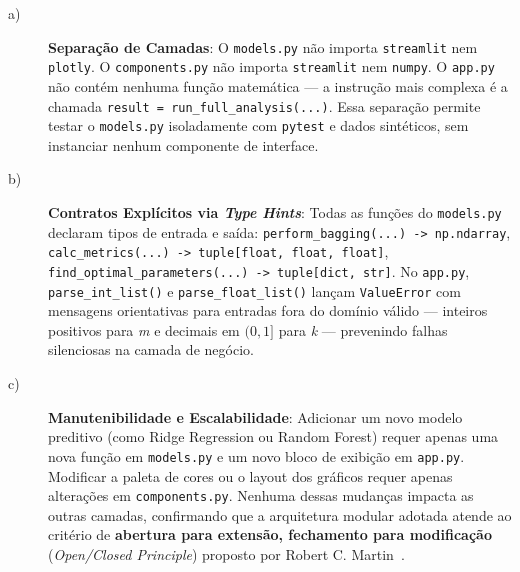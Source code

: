 \begin{description}

\item[a)] \textbf{Separação de Camadas}: O \texttt{models.py} não importa
\texttt{streamlit} nem \texttt{plotly}. O \texttt{components.py} não importa
\texttt{streamlit} nem \texttt{numpy}. O \texttt{app.py} não contém nenhuma função
matemática — a instrução mais complexa é a chamada \texttt{result =
run\_full\_analysis(...)}. Essa separação permite testar o \texttt{models.py}
isoladamente com \texttt{pytest} e dados sintéticos, sem instanciar nenhum componente de
interface.

\item[b)] \textbf{Contratos Explícitos via \textit{Type Hints}}: Todas as funções do
\texttt{models.py} declaram tipos de entrada e saída:
\texttt{perform\_bagging(...) -> np.ndarray},
\texttt{calc\_metrics(...) -> tuple[float, float, float]},
\texttt{find\_optimal\_parameters(...) -> tuple[dict, str]}.
No \texttt{app.py}, \texttt{parse\_int\_list()} e \texttt{parse\_float\_list()} lançam
\texttt{ValueError} com mensagens orientativas para entradas fora do domínio válido —
inteiros positivos para \textit{m} e decimais em $(0,1]$ para \textit{k} — prevenindo
falhas silenciosas na camada de negócio.

\item[c)] \textbf{Manutenibilidade e Escalabilidade}: Adicionar um novo modelo preditivo
(como Ridge Regression ou Random Forest) requer apenas uma nova função em
\texttt{models.py} e um novo bloco de exibição em \texttt{app.py}. Modificar a paleta de
cores ou o layout dos gráficos requer apenas alterações em \texttt{components.py}.
Nenhuma dessas mudanças impacta as outras camadas, confirmando que a arquitetura modular
adotada atende ao critério de \textbf{abertura para extensão, fechamento para
modificação} (\textit{Open/Closed Principle}) proposto por Robert C.
Martin~\cite{martin2008}.

\end{description}
